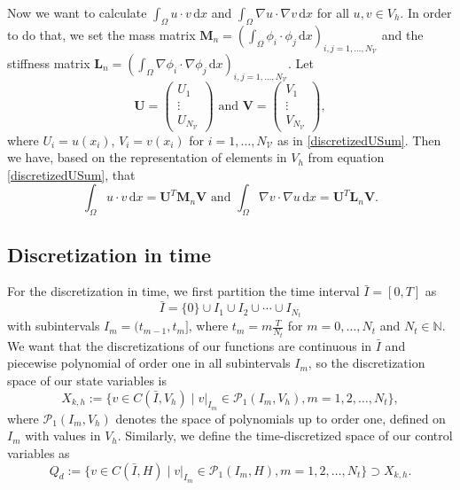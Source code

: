 Now we want to calculate $\int_\Omega u \cdot v \,\mathrm{d}x$ and $\int_\Omega \nabla u \cdot \nabla v \,\mathrm{d}x$ for all $u,v\in  V_h$. In order to do that, we set the mass matrix $\mathbf{M}_n = \left(\int_\Omega \phi_i \cdot \phi_j \,\mathrm{d}x\right)_{i,j=1,\dotsc,N_\mathcal{V}}$ and the stiffness matrix $\mathbf{L}_n = \left(\int_\Omega \nabla\phi_i \cdot \nabla\phi_j \,\mathrm{d}x\right)_{i,j=1,\dotsc,N_\mathcal{V}}$. Let%
\begin{displaymath}
\mathbf{U}=\begin{pmatrix} U_1 \\ \vdots \\ U_{N_\mathcal{V}} \end{pmatrix}\text{ and }\mathbf{V}=\begin{pmatrix} V_1 \\ \vdots \\ V_{N_\mathcal{V}} \end{pmatrix},
\end{displaymath}
where $U_i=u(x_i)$, $V_i=v(x_i)$ for $i=1,\dotsc,N_\mathcal{V}$ as in \eqref{discretizedUSum}. Then we have, based on the representation of elements in $V_h$ from equation \eqref{discretizedUSum}, that
\begin{displaymath}
\int_\Omega u \cdot v \,\mathrm{d}x=\mathbf{U}^T\mathbf{M}_n\mathbf{V}\text{ and }\int_\Omega \nabla v \cdot \nabla u \,\mathrm{d}x=\mathbf{U}^T\mathbf{L}_n\mathbf{V}.
\end{displaymath}


\subsection{\label{SubsectionDiscretizationInTime}Discretization in time}
For the discretization in time, we first partition the time interval $\bar{I}=[0,T]$ as
\begin{displaymath}
\bar{I}=\{0\}\cup I_1\cup I_2\cup\dotsb\cup I_{N_t}
\end{displaymath}
with subintervals $I_m=(t_{m-1},t_m]$, where $t_m=m\frac{T}{N_t}$ for $m=0,\dotsc, N_t$ and $N_t\in\mathbb{N}$. We want that the discretizations of our functions are continuous in $\bar{I}$ and piecewise polynomial of order one in all subintervals $I_m$, so the discretization space of our state variables is
\begin{displaymath}
X_{k,h}:=\{v\in C(\bar{I},V_h)\mid v |_{I_m}\in\mathcal{P}_1(I_m,V_h),m=1,2,\dotsc,N_t\},
\end{displaymath}
where $\mathcal{P}_1(I_m,V_h)$ denotes the space of polynomials up to order one, defined on $I_m$ with values in $V_h$.
Similarly, we define the time-discretized space of our control variables as
\begin{displaymath}
Q_d:=\{v\in C(\bar{I},H)\mid v |_{I_m}\in\mathcal{P}_1(I_m,H),m=1,2,\dotsc,N_t\}\supset X_{k,h}.
\end{displaymath}

